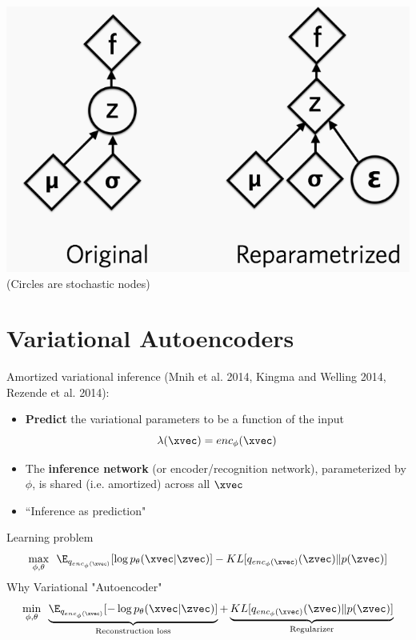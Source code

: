 \begin{frame}
  \begin{center}
   \end{center}
   \center
\includegraphics[scale=0.35]{reparam} \\
(Circles are stochastic nodes)
\end{frame}

\section{Variational Autoencoders}
\begin{frame}
  \begin{center}
   \end{center}
Amortized variational inference (Mnih et al. 2014, Kingma and Welling 2014, Rezende et al. 2014):
\begin{itemize}
\item  \textbf{Predict} the variational parameters to be a function of the input
\[ \lambda(\xvec) = enc_\phi (\xvec) \]
\item The \textbf{inference network} (or encoder/recognition network), parameterized by $\phi$, is shared (i.e. amortized) across all $\xvec$
\item ``Inference as prediction"
\end{itemize}
\end{frame}

\begin{frame}
  \begin{center}
   \end{center}
Learning problem
\[ \max_{\phi, \theta} \,\,\, \E_{q_{enc_\phi(\xvec)}}[\log p_\theta (\xvec | \zvec)] - KL[q_{enc_\phi(\xvec)}(\zvec) \Vert p(\zvec)]\]
Why Variational "Autoencoder"
\[ \min_{\phi, \theta}  \,\,\, \underbrace{\E_{q_{enc_\phi(\xvec)}}[-\log p_\theta (\xvec | \zvec)]}_{\text{Reconstruction loss}} + \underbrace{KL[q_{enc_\phi(\xvec)}(\zvec) \Vert p(\zvec)]}_{\text{Regularizer}}\]
\end{frame}

